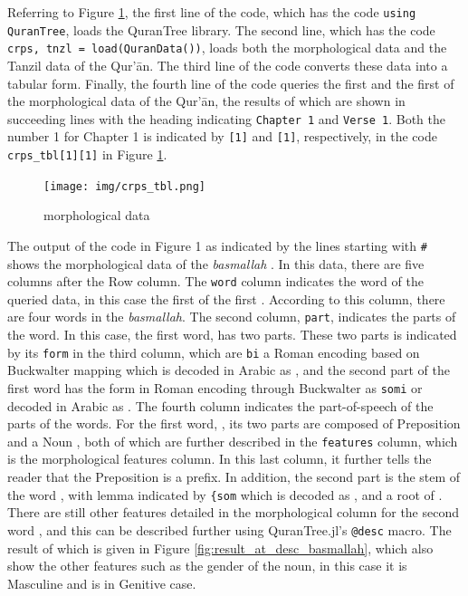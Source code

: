 Referring to Figure \ref{fig:result_crps_tbl}, the first line of the code, which has the code \texttt{using QuranTree}, loads the QuranTree library. The second line, which has the code \texttt{crps, tnzl = load(QuranData())}, loads both the morphological data and the Tanzil data of the Qur'\=an. The third line of the code converts these data into a tabular form. Finally, the fourth line of the code queries the first   and the first   of the morphological data of the Qur'\=an, the results of which are shown in succeeding lines with the heading indicating \texttt{Chapter 1} and \texttt{Verse 1}. Both the number 1 for Chapter 1 is indicated by \texttt{[1]} and \texttt{[1]}, respectively, in the code \verb|crps_tbl[1][1]| in Figure \ref{fig:result_crps_tbl}.

\begin{figure}[!t]
    \centering
    \texttt{[image: img/crps\_tbl.png]}
    \caption{  morphological data}
    \label{fig:result_crps_tbl}
\end{figure}

The output of the code in Figure 1 as indicated by the lines starting with \texttt{\#} shows the morphological data of the \textit{basmallah} . In this data, there are five columns after the Row column. The \texttt{word} column indicates the word of the queried data, in this case the first   of the first  . According to this column, there are four words in the \textit{basmallah}. The second column, \texttt{part}, indicates the parts of the word. In this case, the first word, has two parts. These two parts is indicated by its \texttt{form} in the third column, which are \texttt{bi} a Roman encoding based on Buckwalter mapping which is decoded in Arabic as , and the second part of the first word has the form in Roman encoding through Buckwalter as \texttt{somi} or decoded in Arabic as . The fourth column indicates the part-of-speech of the parts of the words. For the first word, , its two parts are composed of Preposition  and a Noun , both of which are further described in the \texttt{features} column, which is the morphological features column. In this last column, it further tells the reader that the Preposition  is a prefix. In addition, the second part  is the stem of the word , with lemma indicated by \texttt{\{som} which is decoded as , and a root of . There are still other features detailed in the morphological column for the second word , and this can be described further using QuranTree.jl's \texttt{@desc} macro. The result of which is given in Figure \ref{fig:result_at_desc_basmallah}, which also show the other features such as the gender of the noun, in this case it is Masculine and is in Genitive case.

